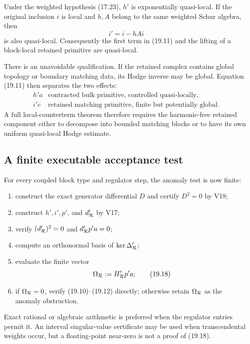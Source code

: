\documentclass[11pt]{article}
\theoremstyle{remark}
\begin{document}
Under the weighted hypothesis (17.23), \(h'\) is exponentially
quasi-local.  If the original inclusion \(i\) is local and
\(h,A\) belong to the same weighted Schur algebra, then
\[
                         i'=i-hAi                           \tag{19.16}
\]
is also quasi-local.  Consequently the first term in (19.11) and the
lifting of a block-local retained primitive are quasi-local.

There is an unavoidable qualification.  If the retained complex
contains global topology or boundary matching data, its Hodge inverse
may be global.  Equation (19.11) then separates the two effects:
\[
\begin{array}{c|c}
h'a&\text{contracted bulk primitive, controlled quasi-locally},\\
i'c&\text{retained matching primitive, finite but potentially global}.
\end{array}                                                   \tag{19.17}
\]
A full local-counterterm theorem therefore requires the harmonic-free
retained component either to decompose into bounded matching blocks or
to have its own uniform quasi-local Hodge estimate.

\subsection{A finite executable acceptance test}

For every coupled block type and regulator step, the anomaly test is
now finite:

\begin{enumerate}
\item construct the exact generator differential \(D\) and certify
      \(D^2=0\) by V18;
\item construct \(h',i',p'\), and \(d_{\cal R}'\) by V17;
\item verify
      \((d_{\cal R}')^2=0\) and
      \(d_{\cal R}'p'a=0\);
\item compute an orthonormal basis of
      \(\ker\Delta_{\cal R}'\);
\item evaluate the finite vector
\[
                         \Omega_{\cal R}:=
 H_{\cal R}'p'a;                                            \tag{19.18}
\]
\item if \(\Omega_{\cal R}=0\), verify (19.10)--(19.12)
      directly; otherwise retain \(\Omega_{\cal R}\) as the
      anomaly obstruction.
\end{enumerate}

Exact rational or algebraic arithmetic is preferred when the
regulator entries permit it.  An interval singular-value certificate
may be used when transcendental weights occur, but a floating-point
near-zero is not a proof of (19.18).
\end{document}
